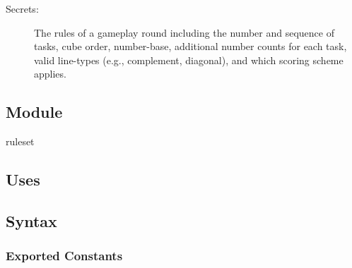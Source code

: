 \documentclass[12pt, titlepage]{article}
\begin{document}
\begin{description}
\item[Secrets:] The rules of a gameplay round including the number and sequence of tasks, cube order, number-base, additional number counts for each task, valid line-types (e.g., complement, diagonal), and which scoring scheme applies.
\end{description}

\subsection{Module}

ruleset

\subsection{Uses}


\subsection{Syntax}

\subsubsection{Exported Constants}
\end{document}
